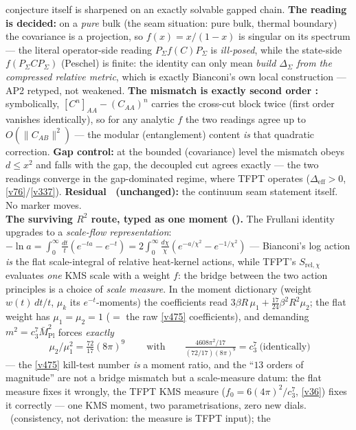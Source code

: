 \documentclass[11pt,a4paper]{article}
\newcommand{\cthree}{c_3}
\newcommand{\Mpl}{\bar M_{\mathrm{Pl}}}
\begin{document}
\begin{keybox}
conjecture itself is sharpened on an exactly solvable gapped chain. \textbf{The reading is decided:}
on a \emph{pure} bulk (the seam situation: pure bulk, thermal boundary) the covariance is a projection,
so $f(x){=}x/(1{-}x)$ is singular on its spectrum --- the literal operator-side reading
$P_\Sigma f(C) P_\Sigma$ is \emph{ill-posed}, while the state-side $f(P_\Sigma C P_\Sigma)$ (Peschel)
is finite: the identity can only mean \emph{build $\Delta_\Sigma$ from the compressed relative metric},
which is exactly Bianconi's own local construction --- AP2 retyped, not weakened. \textbf{The mismatch
is exactly second order \mE:} symbolically, $[C^n]_{AA}-(C_{AA})^n$ carries the cross-cut block twice
(first order vanishes identically), so for any analytic $f$ the two readings agree up to $O(\|C_{AB}\|^2)$
--- the modular (entanglement) content \emph{is} that quadratic correction. \textbf{Gap control:} at the
bounded (covariance) level the mismatch obeys $d\le x^2$ and falls with the gap, the decoupled cut agrees
exactly --- the two readings converge in the gap-dominated regime, where TFPT operates
($\Delta_{\mathrm{eff}}{>}0$, \vref{v76}/\vref{v337}). \textbf{Residual \mO\ (unchanged):} the continuum
seam statement itself. No marker moves.
\smallskip\\
\noindent\textbf{The surviving $R^2$ route, typed as one moment ().}
The Frullani identity upgrades to a \emph{scale-flow representation}: $-\ln a=\int_0^\infty
\tfrac{dt}t(e^{-ta}{-}e^{-t})=2\int_0^\infty\tfrac{d\chi}\chi(e^{-a/\chi^2}{-}e^{-1/\chi^2})$ ---
Bianconi's log action \emph{is} the flat scale-integral of relative heat-kernel actions, while TFPT's
$S_{\mathrm{rel},\chi}$ evaluates \emph{one} KMS scale with a weight $f$: the bridge between the two
action principles is a choice of \emph{scale measure}. In the moment dictionary (weight $w(t)\,dt/t$,
$\mu_k$ its $e^{-t}$-moments) the coefficients read $3\beta R\,\mu_1+\tfrac{17}{24}\beta^2R^2\mu_2$;
the flat weight has $\mu_1{=}\mu_2{=}1$ ($=$ the raw \vref{v475} coefficients), and demanding
$m^2{=}\cthree^7\Mpl^2$ forces \emph{exactly}
\[
  \boxed{\ \mu_2/\mu_1^2=\tfrac{72}{17}(8\pi)^9\ }\qquad\text{with}\qquad
  \tfrac{4608\pi^2/17}{(72/17)(8\pi)^9}=\cthree^7\ \text{(identically)}
\]
--- the \vref{v475} kill-test number \emph{is} a moment ratio, and the ``$13$ orders of magnitude''
are not a bridge mismatch but a scale-measure datum: the flat measure fixes it wrongly, the TFPT KMS
measure ($f_0{=}6(4\pi)^2/\cthree^7$, \vref{v36}) fixes it correctly --- one KMS moment, two
parametrisations, zero new dials. \mC\ (consistency, not derivation: the measure is TFPT input); the

\end{keybox}
\end{document}
